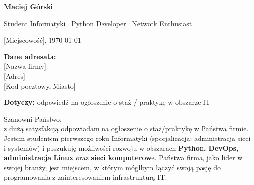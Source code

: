 \documentclass[11pt,a4paper]{article}
\begin{document}
%
\begin{minipage}[t]{0.68\paperwidth}
\vspace{1.2em}
\hspace{1.5em}
\begin{minipage}[t]{0.9\textwidth}

{\fontsize{28}{32}\selectfont\bfseries\color{sidebar} Maciej Górski\par}
\vspace{0.15em}
{\large\color{goldAccent!80!black} Student Informatyki \textbar\ Python Developer \textbar\ Network Enthusiast\par}

\vspace{1.2em}

{\small\color{mutedText}
\hspace{0.3em}[Miejscowość], \today
}

\vspace{1.5em}

{\small
\textbf{\hspace{0.3em}Dane adresata:}\\[0.3em]
[Nazwa firmy]\\[0.1em]
[Adres]\\[0.1em]
[Kod pocztowy, Miasto]
}

\vspace{1.5em}


\vspace{0.4em}
\noindent\textbf{Dotyczy:} odpowiedź na ogłoszenie o staż / praktykę w obszarze IT

\vspace{0.8em}

Szanowni Państwo,\\[0.6em]

z dużą satysfakcją odpowiadam na ogłoszenie o staż/praktykę w Państwa firmie. Jestem studentem pierwszego roku Informatyki (specjalizacja: administracja sieci i systemów) i poszukuję możliwości rozwoju w obszarach \textbf{Python, DevOps, administracja Linux} oraz \textbf{sieci komputerowe}. Państwa firma, jako lider w swojej branży, jest miejscem, w którym mógłbym łączyć swoją pasję do programowania z zainteresowaniem infrastrukturą IT.

\vspace{0.4em}


\end{minipage}
\end{minipage}
\end{document}
